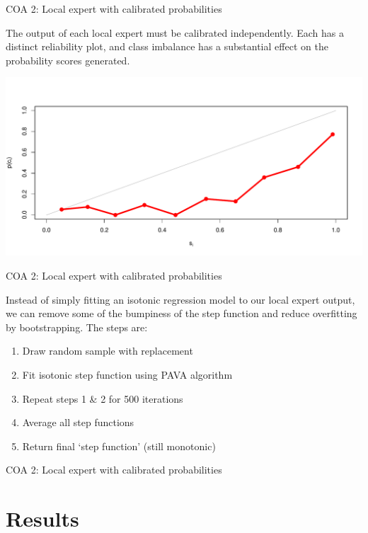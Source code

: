 \documentclass[ignorenonframetext,]{beamer}
\providecommand{\tightlist}{%
\setlength{\itemsep}{0pt}\setlength{\parskip}{0pt}}
\begin{document}
\begin{frame}{COA 2: Local expert with calibrated probabilities}

The output of each local expert must be calibrated independently. Each
has a distinct reliability plot, and class imbalance has a substantial
effect on the probability scores generated.

\includegraphics{presentation_files/figure-beamer/unnamed-chunk-19-1.pdf}

\end{frame}

\begin{frame}{COA 2: Local expert with calibrated probabilities}

Instead of simply fitting an isotonic regression model to our local
expert output, we can remove some of the bumpiness of the step function
and reduce overfitting by bootstrapping. The steps are:

\begin{enumerate}
\def\labelenumi{\arabic{enumi}.}
\tightlist
\item
  Draw random sample with replacement
\item
  Fit isotonic step function using PAVA algorithm
\item
  Repeat steps 1 \& 2 for 500 iterations
\item
  Average all step functions
\item
  Return final `step function' (still monotonic)
\end{enumerate}

\end{frame}

\begin{frame}{COA 2: Local expert with calibrated probabilities}

\end{frame}

\section{Results}\label{results}
\end{document}
